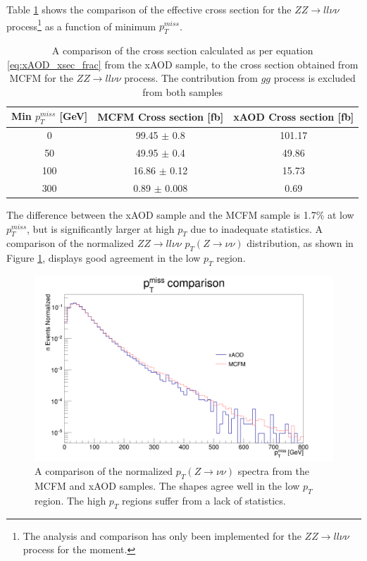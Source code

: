 \documentclass[11pt,a4paper,final]{report}
\newcommand{\ZZ}{$ZZ\rightarrow ll\nu\nu$ }
\begin{document}
Table \ref{table:xAOD_MCFM_ZZ_compare} shows the comparison of the effective cross section for the \ZZ process\footnote{The analysis and comparison has only been implemented for the \ZZ process for the moment.} as a function of minimum $p_T^{miss}$.

\begin{table}[H]
	\centering
	\begin{tabular}{|c|c|c|}
	\hline
	Min $p_T^{miss}$ [GeV] & MCFM Cross section [fb] & xAOD Cross section [fb]\\
	\hline
	0 & 99.45 $\pm$ 0.8 & 101.17\\
	50 & 49.95 $\pm$ 0.4 & 49.86\\
	100 & 16.86 $\pm$ 0.12 & 15.73\\
	300 & 0.89 $\pm$ 0.008 & 0.69\\
	\hline
	\end{tabular}
	\caption{A comparison of the cross section calculated as per equation \ref{eq:xAOD_xsec_frac} from the xAOD sample, to the cross section obtained from MCFM for the \ZZ process. The contribution from $gg$ process is excluded from both samples}
	\label{table:xAOD_MCFM_ZZ_compare}
\end{table}

The difference between the xAOD sample and the MCFM sample is 1.7\% at low $p_T^{miss}$, but is significantly larger at high $p_T$ due to inadequate statistics. A comparison of the normalized \ZZ $p_T(Z\rightarrow\nu\nu)$ distribution, as shown in Figure \ref{fig:MCFM_xAOD_ZZ_xsec}, displays good agreement in the low $p_T$ region.

\begin{figure}[H]
\centering
	\includegraphics[width=\textwidth]{MCFM_xAOD_ZZ_xsec.png}
	\caption{A comparison of the normalized $p_T(Z\rightarrow\nu\nu)$ spectra from the MCFM and xAOD samples. The shapes agree well in the low $p_T$ region. The high $p_T$ regions suffer from a lack of statistics.}
	\label{fig:MCFM_xAOD_ZZ_xsec}
\end{figure}
\end{document}
